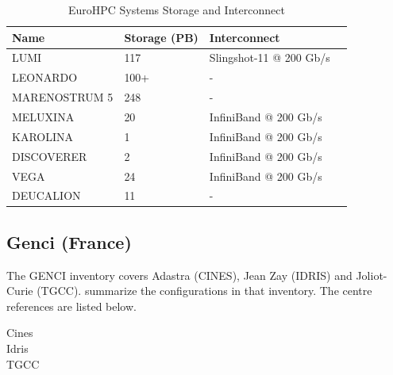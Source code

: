 \begin{table}[!ht]
    \centering
    \begin{tabular}{l l l l}
    \toprule
    \textbf{Name} & \textbf{Storage (PB)} & \textbf{Interconnect} \\
    \midrule
    LUMI & 117 & Slingshot-11 @ 200 Gb/s \\
    LEONARDO & 100+ & - \\
    MARENOSTRUM 5 & 248 & - \\
    MELUXINA & 20 & InfiniBand @ 200 Gb/s \\
    KAROLINA & 1 & InfiniBand @ 200 Gb/s \\
    DISCOVERER & 2 & InfiniBand @ 200 Gb/s \\
    VEGA & 24 & InfiniBand @ 200 Gb/s \\
    DEUCALION & 11 & - \\
    \bottomrule
    \end{tabular}
    \caption{EuroHPC Systems Storage and Interconnect}
    \label{tab:eurohpc_storage_interconnect}
\end{table}

\subsection*{Genci (France)}
\label{sec:arch:genci}

The \ac{GENCI} inventory covers Adastra (CINES), Jean Zay (IDRIS)
and Joliot-Curie (TGCC). 
summarize the configurations in that inventory. The centre references are
listed below.
\begin{description}
    \item[Cines] 
    \item[Idris] 
    \item[TGCC]  
\end{description}


